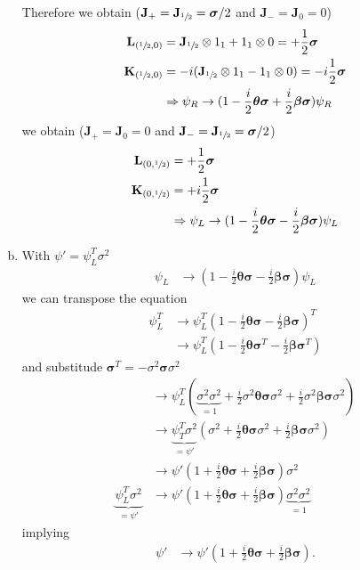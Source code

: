 \documentclass[../main.tex]{subfiles}
\begin{document}
\begin{enumerate}[(a)]
Therefore we obtain ($\mathbf{J}_+=\mathbf{J}_{\sfrac{1}{2}}=\boldsymbol{\sigma}/2$ and $\mathbf{J}_-=\mathbf{J}_0=0$)
\begin{align}
\mathbf{L}_{(\sfrac{1}{2},0)}&=\mathbf{J}_{\sfrac{1}{2}}\otimes1_1+1_1\otimes0=+\frac{1}{2}\boldsymbol{\sigma}\\
\mathbf{K}_{(\sfrac{1}{2},0)}&=-i(\mathbf{J}_{\sfrac{1}{2}}\otimes1_1-1_1\otimes0)=-i\frac{1}{2}\boldsymbol{\sigma}\\
&\Rightarrow\psi_R\rightarrow(1-\frac{i}{2}\boldsymbol{\theta}\boldsymbol{\sigma}+\frac{i}{2}\boldsymbol{\beta}\boldsymbol{\sigma})\psi_R
\end{align}
we obtain ($\mathbf{J}_+=\mathbf{J}_0=0$ and $\mathbf{J}_-=\mathbf{J}_{\sfrac{1}{2}}=\boldsymbol{\sigma}/2$)
\begin{align}
\mathbf{L}_{(0,\sfrac{1}{2})}&=+\frac{1}{2}\boldsymbol{\sigma}\\
\mathbf{K}_{(0,\sfrac{1}{2})}&=+i\frac{1}{2}\boldsymbol{\sigma}\\
&\Rightarrow\psi_L\rightarrow(1-\frac{i}{2}\boldsymbol{\theta}\boldsymbol{\sigma}-\frac{i}{2}\boldsymbol{\beta}\boldsymbol{\sigma})\psi_L
\end{align}

\item With $\psi'=\psi_L^T\sigma^2$
\begin{align}
\psi_L&\rightarrow(1-\frac{i}{2}\boldsymbol{\theta}\boldsymbol{\sigma}-\frac{i}{2}\boldsymbol{\beta}\boldsymbol{\sigma})\psi_L
\end{align}
we can transpose the equation
\begin{align}
\psi_L^T&\rightarrow\psi_L^T(1-\frac{i}{2}\boldsymbol{\theta}\boldsymbol{\sigma}-\frac{i}{2}\boldsymbol{\beta}\boldsymbol{\sigma})^T\\
&\rightarrow\psi_L^T(1-\frac{i}{2}\boldsymbol{\theta}\boldsymbol{\sigma}^T-\frac{i}{2}\boldsymbol{\beta}\boldsymbol{\sigma}^T)
\end{align}
and substitude $\boldsymbol{\sigma}^T=-\sigma^2\boldsymbol{\sigma}\sigma^2$
\begin{align}
&\rightarrow\psi_L^T(\underbrace{\sigma^2\sigma^2}_{=1}+\frac{i}{2}\sigma^2\boldsymbol{\theta}\boldsymbol{\sigma}\sigma^2+\frac{i}{2}\sigma^2\boldsymbol{\beta}\boldsymbol{\sigma}\sigma^2)\\
&\rightarrow\underbrace{\psi_T^T\sigma^2}_{=\psi'}(\sigma^2+\frac{i}{2}\boldsymbol{\theta}\boldsymbol{\sigma}\sigma^2+\frac{i}{2}\boldsymbol{\beta}\boldsymbol{\sigma}\sigma^2)\\
&\rightarrow\psi'(1+\frac{i}{2}\boldsymbol{\theta}\boldsymbol{\sigma}+\frac{i}{2}\boldsymbol{\beta}\boldsymbol{\sigma})\sigma^2\\
\underbrace{\psi_L^T\sigma^2}_{=\psi'}&\rightarrow\psi'(1+\frac{i}{2}\boldsymbol{\theta}\boldsymbol{\sigma}+\frac{i}{2}\boldsymbol{\beta}\boldsymbol{\sigma})\underbrace{\sigma^2\sigma^2}_{=1}
\end{align}
implying
\begin{align}
\psi'&\rightarrow\psi'(1+\frac{i}{2}\boldsymbol{\theta}\boldsymbol{\sigma}+\frac{i}{2}\boldsymbol{\beta}\boldsymbol{\sigma}).
\end{align}


\end{enumerate}
\end{document}
